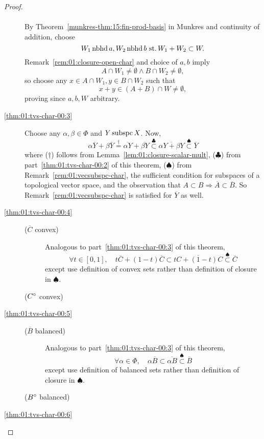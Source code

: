 \begin{proof}
\begin{description}
    \paragraph{}
    By Theorem~\ref{munkres-thm:15:fin-prod-basis} in Munkres
    and continuity of addition, choose
    \[ W_1 \operatorname{nbhd} a, W_2 \operatorname{nbhd} b \operatorname{\,st.} W_1 + W_2 \subset W. \]
    Remark~\ref{rem:01:closure-open-char} and choice of ${a,b}$
    imply
    \[ A\cap W_1 \neq\emptyset \land B\cap W_2 \neq\emptyset, \]
    so choose any ${x\in A\cap W_1, y\in B\cap W_2}$ such that
    \[ x+y\in (A+B) \cap W \neq\emptyset, \]
    proving since ${a, b, W}$ arbitrary.
  \item[\ref{thm:01:tvs-char-00:3}]
    Choose any ${\alpha,\beta\in\Phi}$ and ${Y\operatorname{subspc} X}$.  Now,
    \[
    \alpha\overline{Y} + \beta\overline{Y}
    \stackrel{\dag}{=}
    \overline{\alpha Y} + \overline{\beta Y}
    \stackrel{\clubsuit}{\subset}
    \overline{\alpha Y + \beta Y}
    \stackrel{\spadesuit}{\subset} \overline{Y}
    \]
    where
    ($\dag$) follows from Lemma~\ref{lem:01:closure-scalar-mult},
    ($\clubsuit$) from part~\ref{thm:01:tvs-char-00:2} of this theorem,
    ($\spadesuit$) from
    Remark~\ref{rem:01:vecsubspc-char}, the sufficient condition
    for subspaces of a topological vector space,
    and the observation that
    ${A\subset B\Rightarrow \overline{A}\subset \overline{B}}$.
    So Remark~\ref{rem:01:vecsubspc-char}
    is satisfied for $\overline{Y}$ as well.
  \item[\ref{thm:01:tvs-char-00:4}]
    \begin{description}
    \item[($\overline{C}$ convex)]
      Analogous to part~\ref{thm:01:tvs-char-00:3} of this theorem,
      \[
      \forall t\in[0, 1],\quad
      t\overline{C} + (1-t)\overline{C} \subset
      \overline{tC + (1-t)C}
      \stackrel{\spadesuit}{\subset} \overline{C}
      \]
      except use definition of convex sets rather than
      definition of closure in $\spadesuit$.
    \item[(${C}^{\circ}$ convex)]
    \end{description}
  \item[\ref{thm:01:tvs-char-00:5}]
    \begin{description}
    \item[($\overline{B}$ balanced)]
      Analogous to part~\ref{thm:01:tvs-char-00:3} of this theorem,
      \[
      \forall \alpha\in\Phi,\quad
      \alpha\overline{B}\subset \overline{\alpha B}
      \stackrel{\spadesuit}{\subset} \overline{B}
      \]
      except use definition of balanced sets rather than
      definition of closure in $\spadesuit$.
    \item[(${B}^{\circ}$ balanced)]
    \end{description}
  \item[\ref{thm:01:tvs-char-00:6}]
  \end{description}
\end{proof}
